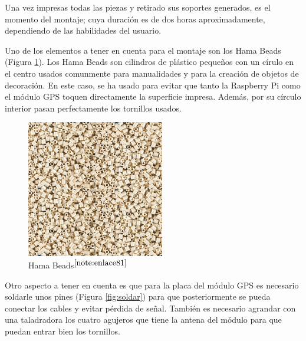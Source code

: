 Una vez impresas todas las piezas y retirado sus soportes generados, es el momento del montaje; cuya duración es de dos horas aproximadamente, dependiendo de las habilidades del usuario.

Uno de los elementos a tener en cuenta para el montaje son los Hama Beads (Figura \ref{fig:hamabeads}). Los Hama Beads son cilindros de plástico pequeños con un círulo en el centro usados comunmente para manualidades y para la creación de objetos de decoración. En este caso, se ha usado para evitar que tanto la Raspberry Pi como el módulo GPS toquen directamente la superficie impresa. Además, por su círculo interior pasan perfectamente los tornillos usados. 

\begin{figure} [h!]
	\begin{center}
		\includegraphics[width=6cm]{figs/cap5/hama.png}
	\end{center}
	\caption{Hama Beads$^{\ref{note:enlace81}}$} 
	\label{fig:hamabeads}
\end{figure}

\setcounter{footnote}{81} %


Otro aspecto a tener en cuenta es que para la placa del módulo GPS es necesario soldarle unos pines (Figura \ref{fig:soldar}) para que posteriormente se pueda conectar los cables y evitar pérdida de señal. También es necesario agrandar con una taladradora los cuatro agujeros que tiene la antena del módulo para que puedan entrar bien los tornillos. 

